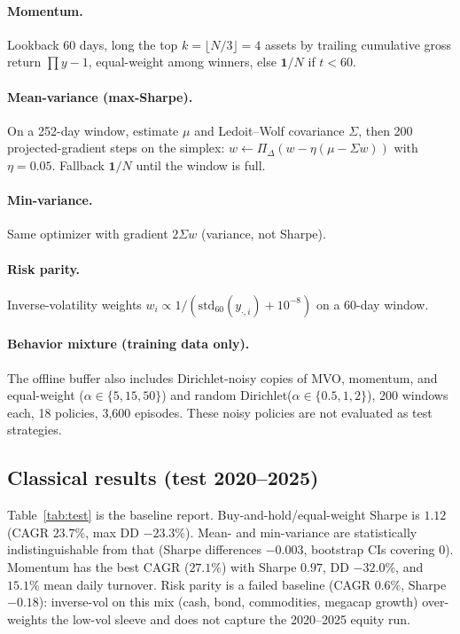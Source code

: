 \documentclass[11pt]{article}
\begin{document}
\paragraph{Momentum.}
Lookback 60 days, long the top $k=\lfloor N/3\rfloor=4$ assets by trailing cumulative gross return $\prod y-1$, equal-weight among winners, else $\mathbf{1}/N$ if $t<60$.

\paragraph{Mean-variance (max-Sharpe).}
On a 252-day window, estimate $\mu$ and Ledoit--Wolf covariance $\Sigma$, then 200 projected-gradient steps on the simplex: $w \leftarrow \Pi_{\Delta}(w - \eta(\mu-\Sigma w))$ with $\eta=0.05$. Fallback $\mathbf{1}/N$ until the window is full.

\paragraph{Min-variance.}
Same optimizer with gradient $2\Sigma w$ (variance, not Sharpe).

\paragraph{Risk parity.}
Inverse-volatility weights $w_i \propto 1/(\mathrm{std}_{60}(y_{\cdot,i})+10^{-8})$ on a 60-day window.

\paragraph{Behavior mixture (training data only).}
The offline buffer also includes Dirichlet-noisy copies of MVO, momentum, and equal-weight ($\alpha\in\{5,15,50\}$) and random Dirichlet($\alpha\in\{0.5,1,2\}$), 200 windows each, 18 policies, 3{,}600 episodes. These noisy policies are not evaluated as test strategies.

\subsection{Classical results (test 2020--2025)}
Table~\ref{tab:test} is the baseline report. Buy-and-hold/equal-weight Sharpe is $1.12$ (CAGR $23.7\%$, max DD $-23.3\%$). Mean- and min-variance are statistically indistinguishable from that (Sharpe differences $-0.003$, bootstrap CIs covering 0). Momentum has the best CAGR ($27.1\%$) with Sharpe $0.97$, DD $-32.0\%$, and $15.1\%$ mean daily turnover. Risk parity is a failed baseline (CAGR $0.6\%$, Sharpe $-0.18$): inverse-vol on this mix (cash, bond, commodities, megacap growth) over-weights the low-vol sleeve and does not capture the 2020--2025 equity run.
\end{document}
